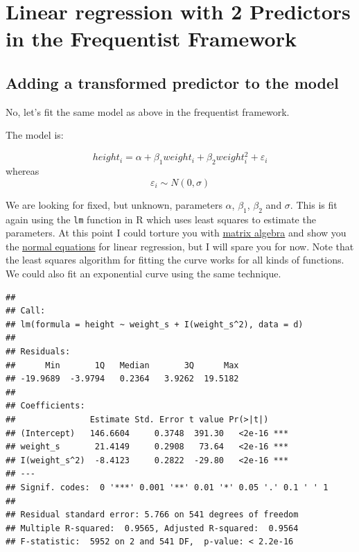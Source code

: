 \documentclass[
]{book}
\newenvironment{Shaded}{\begin{snugshade}}{\end{snugshade}}
\newcommand{\AttributeTok}[1]{\textcolor[rgb]{0.13,0.29,0.53}{#1}}
\newcommand{\CommentTok}[1]{\textcolor[rgb]{0.56,0.35,0.01}{\textit{#1}}}
\newcommand{\DecValTok}[1]{\textcolor[rgb]{0.00,0.00,0.81}{#1}}
\newcommand{\FloatTok}[1]{\textcolor[rgb]{0.00,0.00,0.81}{#1}}
\newcommand{\FunctionTok}[1]{\textcolor[rgb]{0.13,0.29,0.53}{\textbf{#1}}}
\newcommand{\NormalTok}[1]{#1}
\newcommand{\OtherTok}[1]{\textcolor[rgb]{0.56,0.35,0.01}{#1}}
\newcommand{\SpecialCharTok}[1]{\textcolor[rgb]{0.81,0.36,0.00}{\textbf{#1}}}
\begin{document}
\section{Linear regression with 2 Predictors in the Frequentist Framework}\label{linear-regression-with-2-predictors-in-the-frequentist-framework}

\subsection{Adding a transformed predictor to the model}\label{adding-a-transformed-predictor-to-the-model}

No, let's fit the same model as above in the frequentist framework.

The model is:

\[height_i = \alpha + \beta_1 weight_i + \beta_2 weight_i^2 + \varepsilon_i\]
whereas
\[\varepsilon_i \sim N(0, \sigma)\]

We are looking for fixed, but unknown, parameters \(\alpha\), \(\beta_1\), \(\beta_2\) and \(\sigma\).
This is fit again using the \texttt{lm} function in R which uses least squares to estimate the parameters.
At this point I could torture you with \href{https://en.wikipedia.org/wiki/Matrix_(mathematics)}{matrix algebra}
and show you the \href{https://en.wikipedia.org/wiki/Linear_least_squares}{normal equations} for linear regression,
but I will spare you for now.
Note that the least squares algorithm for fitting the curve works for all
kinds of functions. We could also fit an exponential curve using the same
technique.

\begin{Shaded}
\end{Shaded}

\begin{verbatim}
## 
## Call:
## lm(formula = height ~ weight_s + I(weight_s^2), data = d)
## 
## Residuals:
##      Min       1Q   Median       3Q      Max 
## -19.9689  -3.9794   0.2364   3.9262  19.5182 
## 
## Coefficients:
##               Estimate Std. Error t value Pr(>|t|)    
## (Intercept)   146.6604     0.3748  391.30   <2e-16 ***
## weight_s       21.4149     0.2908   73.64   <2e-16 ***
## I(weight_s^2)  -8.4123     0.2822  -29.80   <2e-16 ***
## ---
## Signif. codes:  0 '***' 0.001 '**' 0.01 '*' 0.05 '.' 0.1 ' ' 1
## 
## Residual standard error: 5.766 on 541 degrees of freedom
## Multiple R-squared:  0.9565, Adjusted R-squared:  0.9564 
## F-statistic:  5952 on 2 and 541 DF,  p-value: < 2.2e-16
\end{verbatim}
\end{document}
